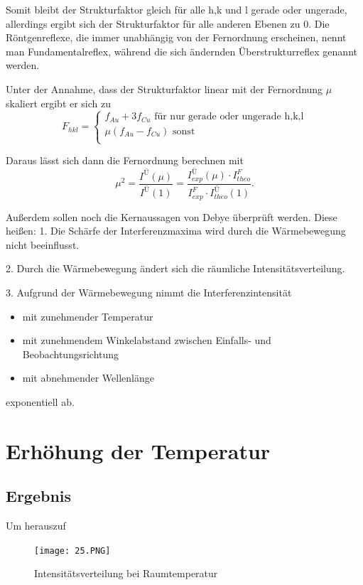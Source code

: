 \documentclass[
	a4paper,
	12pt,
	pagesize,
	ngerman
]{scrartcl}
\begin{document}
Somit bleibt der Strukturfaktor gleich für alle h,k und l gerade oder ungerade, allerdings ergibt sich der Strukturfaktor für alle anderen Ebenen zu 0. 
Die Röntgenreflexe, die immer unabhängig von der Fernordnung erscheinen, nennt man Fundamentalreflex, während die sich ändernden Überstrukturreflex genannt werden.

Unter der Annahme, dass der Strukturfaktor linear mit der Fernordnung $\mu$ skaliert ergibt er sich zu
\begin{equation}
F_{hkl} = \left \{ \begin{array}{ll}
f_{Au} + 3f_{Cu} \text{  für nur gerade oder ungerade h,k,l} \\
\mu (f_{Au} - f_{Cu}) \text{  sonst} \\
\end{array} \right .
\end{equation}

Daraus lässt sich dann die Fernordnung berechnen  mit 
\begin{equation}
\mu^{2} = \frac{I^{Ü}(\mu)}{I^{Ü}(1)} = \frac{I^{Ü}_{exp}(\mu)\cdot I^{F}_{theo}}{I^{F}_{exp} \cdot I^{Ü}_{theo}(1)}.
\end{equation}  

Außerdem sollen noch die Kernaussagen von Debye überprüft werden. Diese heißen:
1. Die Schärfe der Interferenzmaxima wird durch die Wärmebewegung nicht beeinflusst.

2. Durch die Wärmebewegung ändert sich die räumliche Intensitätsverteilung.

3. Aufgrund der Wärmebewegung nimmt die Interferenzintensität
\begin{itemize}
\item mit zunehmender Temperatur 
\item mit zunehmendem Winkelabstand zwischen Einfalls- und Beobachtungsrichtung 
\item mit abnehmender Wellenlänge
\end{itemize}
exponentiell ab.
\section{Erhöhung der Temperatur}
\subsection{Ergebnis}
Um herauszuf

\begin{figure}[h]
	\centering
	\texttt{[image: 25.PNG]}
	\caption{Intensitätsverteilung bei Raumtemperatur}
	\label{ski}
\end{figure}
\end{document}
